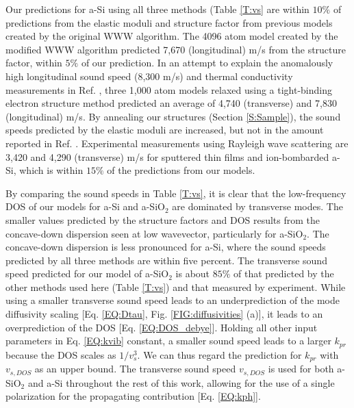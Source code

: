 \documentclass[aps,prb,onecolumn,preprint,superscriptaddress,footinbib,amsmath,amssymb,floatfix]{revtex4}
\begin{document}
Our predictions for a-Si using all three methods (Table \ref{T:vs} 
are within $10\%$ of predictions from the elastic moduli
\cite{kluge_elastic_1988,feldman_elastic_1991} 
and structure factor\cite{feldman_calculations_2002} 
from previous models created by the original WWW algorithm.
\cite{wooten_computer_1985} 
The 4096 atom model created by the modified WWW algorithm
\cite{barkema_high-quality_2000} predicted 
7,670 (longitudinal) m/s from the structure factor,
\cite{christie_vibrational_2007} within $5\%$ of our prediction. 
In an attempt to explain the  
anomalously high longitudinal sound speed (8,300 m/s) and  
thermal conductivity measurements in Ref. , 
three 1,000 atom models relaxed using a tight-binding electron 
structure method predicted an average of 4,740 (transverse) and 
7,830 (longitudinal) m/s.\cite{liu_high_2009} 
By annealing our structures (Section \ref{S:Sample}), 
the sound speeds predicted by the elastic moduli are increased, but 
not in the amount reported in Ref. . 
Experimental measurements using Rayleigh wave scattering 
are 3,420 and 4,290 (transverse) m/s for sputtered thin films 
and ion-bombarded a-Si,\cite{vacher_attenuation_1980} which 
is within $15\%$ of the predictions from our models. 

By comparing the sound speeds in Table \ref{T:vs}, it is clear that 
the low-frequency DOS of our models for a-Si and a-SiO$_2$ are 
dominated by 
transverse modes. 
The smaller values predicted by the structure factors and DOS 
results from the concave-down dispersion seen at low 
wavevector, particularly for a-SiO$_2$. The concave-down dispersion 
is less pronounced for a-Si, where the sound speeds predicted 
by all three methods are within five percent. 
The transverse sound speed predicted for our model of 
a-SiO$_2$ is about $85\%$ of that predicted by 
the other methods used here (Table \ref{T:vs}) and that 
measured by experiment.
\cite{vacher_ultrasonic_1981,benassi_evidence_1996,
ruocco_high-frequency_2001,polian_elastic_2002,
ruzicka_evidence_2004} 
While using a smaller transverse sound speed 
leads to an underprediction of the 
mode diffusivity scaling [Eq. \eqref{EQ:Dtau},
Fig. \ref{FIG:diffusivities} (a)], it leads to an 
overprediction of the DOS [Eq. \eqref{EQ:DOS_debye}]. 
Holding all other input parameters in Eq. \eqref{EQ:kvib} constant, 
a smaller sound speed leads to a larger $k_{pr}$ 
because the DOS scales as $1/v^3_{s}$. We can thus regard 
the prediction for $k_{pr}$ with $v_{s,DOS}$ as an upper bound. 
The transverse sound speed $v_{s,DOS}$ is used for both 
a-SiO$_2$ and a-Si throughout the rest of this work, allowing 
for the use of a single polarization for the propagating 
contribution [Eq. \eqref{EQ:kph}]. 
\end{document}

